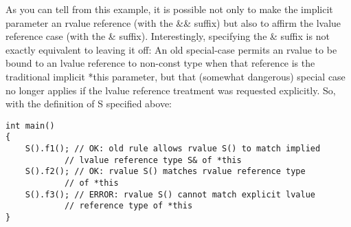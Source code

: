As you can tell from this example, it is possible not only to make the implicit parameter an rvalue reference (with the \&\& suffix) but also to affirm the lvalue reference case (with the \& suffix). Interestingly, specifying the \& suffix is not exactly equivalent to leaving it off: An old special-case permits an rvalue to be bound to an lvalue reference to non-const type when that reference is the traditional implicit *this parameter, but that (somewhat dangerous) special case no longer applies if the lvalue reference treatment was requested explicitly. So, with the definition of S specified above:

\begin{lstlisting}[style=styleCXX]
int main()
{
	S().f1(); // OK: old rule allows rvalue S() to match implied
			// lvalue reference type S& of *this
	S().f2(); // OK: rvalue S() matches rvalue reference type
			// of *this
	S().f3(); // ERROR: rvalue S() cannot match explicit lvalue
			// reference type of *this
}
\end{lstlisting}


